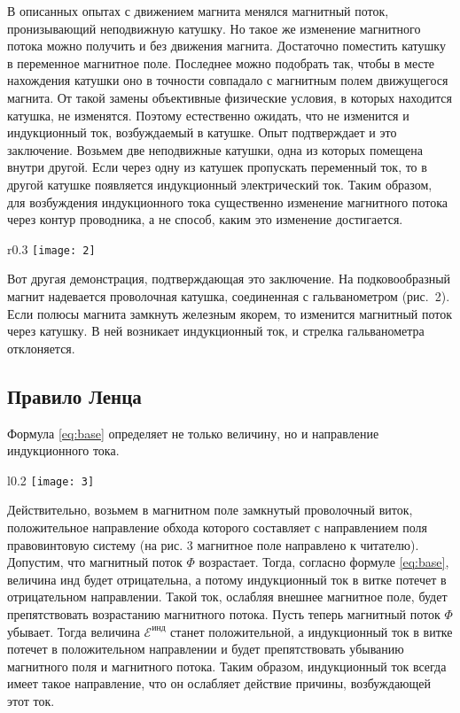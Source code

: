 В описанных опытах с движением магнита
менялся магнитный поток, пронизывающий
неподвижную катушку. Но такое же
изменение магнитного потока можно
получить и без движения магнита.
Достаточно поместить катушку в
переменное магнитное поле. Последнее
можно подобрать так, чтобы в месте
нахождения катушки оно в точности
совпадало с магнитным полем движущегося
магнита. От такой замены объективные
физические условия, в которых находится
катушка, не изменятся. Поэтому
естественно ожидать, что не изменится и
индукционный ток, возбуждаемый в
катушке. Опыт подтверждает и это
заключение. Возьмем две неподвижные
катушки, одна из которых помещена внутри
другой. Если через одну из катушек
пропускать переменный ток, то в другой
катушке появляется индукционный
электрический ток. Таким образом, для
возбуждения индукционного тока
существенно изменение магнитного потока
через контур проводника, а не способ,
каким это изменение достигается.

\begin{wrapfigure}[7]{r}{0.3\linewidth}
    \vspace{-20pt}
    \texttt{[image: 2]}
    \captionsetup{justification=centering}
    \caption{}
\end{wrapfigure}

Вот другая демонстрация, подтверждающая
это заключение. На подковообразный
магнит надевается проволочная катушка,
соединенная с гальванометром (рис.~2).
Если полюсы магнита замкнуть железным якорем, то изменится магнитный
поток через катушку. В ней возникает
индукционный ток, и стрелка
гальванометра отклоняется.

\subsection{Правило Ленца}
Формула \eqref{eq:base} определяет не
только
величину, но и направление индукционного
тока.

\begin{wrapfigure}{l}{0.2\linewidth}
    \texttt{[image: 3]}
    \captionsetup{justification=centering}
    \caption{}
\end{wrapfigure}

\noindent Действительно, возьмем в магнитном
поле замкнутый проволочный виток,
положительное направление обхода
которого составляет с направлением поля
правовинтовую систему (на рис. 3 
магнитное поле направлено к читателю).
Допустим, что магнитный поток $\Phi$  
возрастает. Тогда, согласно формуле
\eqref{eq:base}, величина инд будет
отрицательна, а потому индукционный ток
в витке потечет в отрицательном
направлении. Такой ток, ослабляя внешнее
магнитное поле, будет препятствовать
возрастанию магнитного потока. Пусть
теперь магнитный поток $\Phi$ убывает.
Тогда величина $\mathscr{E}^\text{инд}$
станет положительной, а индукционный ток
в витке потечет в положительном
направлении и будет препятствовать
убыванию магнитного поля и магнитного
потока. Таким образом, индукционный ток
всегда имеет такое направление, что он
ослабляет действие причины, возбуждающей
этот ток.

